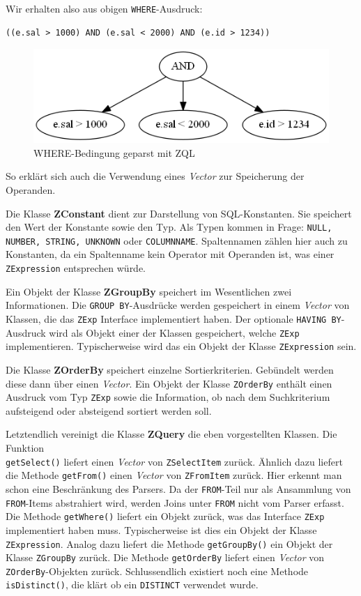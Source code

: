 Wir erhalten also aus obigen \verb|WHERE|-Ausdruck:
\begin{verbatim}
((e.sal > 1000) AND (e.sal < 2000) AND (e.id > 1234))
\end{verbatim}

\begin{figure}
\includegraphics[scale=0.7]{Bilder/with_zql.png}
\caption{WHERE-Bedingung geparst mit ZQL}
\end{figure}

So erklärt sich auch die Verwendung eines \textit{Vector} zur Speicherung der Operanden.

Die Klasse \textbf{ZConstant} dient zur Darstellung von SQL-Konstanten. Sie speichert den Wert der Konstante sowie den Typ. Als Typen kommen in Frage: \verb|NULL, NUMBER, STRING, UNKNOWN| oder \verb|COLUMNNAME|. Spaltennamen zählen hier auch zu Konstanten, da ein Spaltenname kein Operator mit Operanden ist, was einer \verb|ZExpression| entsprechen würde.

Ein Objekt der Klasse \textbf{ZGroupBy} speichert im Wesentlichen zwei Informationen. Die \verb|GROUP BY|-Ausdrücke werden gespeichert in einem \textit{Vector} von Klassen, die das \verb|ZExp| Interface implementiert haben. Der optionale \verb|HAVING BY|-Ausdruck wird als Objekt einer der Klassen gespeichert, welche \verb|ZExp| implementieren. Typischerweise wird das ein Objekt der Klasse \verb|ZExpression| sein.

Die Klasse \textbf{ZOrderBy} speichert einzelne Sortierkriterien. Gebündelt werden diese dann über einen \textit{Vector}. Ein Objekt der Klasse \verb|ZOrderBy| enthält einen Ausdruck vom Typ \verb|ZExp| sowie die Information, ob nach dem Suchkriterium aufsteigend oder absteigend sortiert werden soll.

Letztendlich vereinigt die Klasse \textbf{ZQuery} die eben vorgestellten Klassen. Die Funktion \\\verb|getSelect()| liefert einen \textit{Vector} von \verb|ZSelectItem| zurück. Ähnlich dazu liefert die Methode \verb|getFrom()| einen \textit{Vector} von \verb|ZFromItem| zurück. Hier erkennt man schon eine Beschränkung des Parsers. Da der \verb|FROM|-Teil nur als Ansammlung von \verb|FROM|-Items abstrahiert wird, werden Joins unter \verb|FROM| nicht vom Parser erfasst. Die Methode \verb|getWhere()| liefert ein Objekt zurück, was das Interface \verb|ZExp| implementiert haben muss. Typischerweise ist dies ein Objekt der Klasse \verb|ZExpression|. Analog dazu liefert die Methode \verb|getGroupBy()| ein Objekt der Klasse \verb|ZGroupBy| zurück. Die Methode \verb|getOrderBy| liefert einen \textit{Vector} von \verb|ZOrderBy|-Objekten zurück.
Schlussendlich existiert noch eine Methode \verb|isDistinct()|, die klärt ob ein \verb|DISTINCT| verwendet wurde.

